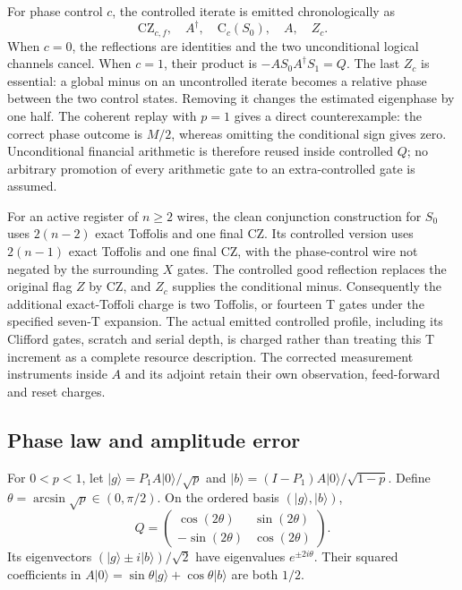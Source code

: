 For phase control $c$, the controlled iterate is emitted chronologically as
\[
 \mathrm{CZ}_{c,f},\quad A^\dagger,\quad
 \mathrm{C}_c(S_0),\quad A,\quad Z_c.
\]
When $c=0$, the reflections are identities and the two unconditional
logical channels cancel. When $c=1$, their product is
$-A S_0 A^\dagger S_1=Q$. The last $Z_c$ is essential: a global minus on an
uncontrolled iterate becomes a relative phase between the two control
states. Removing it changes the estimated eigenphase by one half. The
coherent replay with $p=1$ gives a direct counterexample: the correct phase
outcome is $M/2$, whereas omitting the conditional sign gives zero.
Unconditional financial arithmetic is therefore reused inside controlled
$Q$; no arbitrary promotion of every arithmetic gate to an extra-controlled
gate is assumed.

For an active register of $n\geq2$ wires, the clean conjunction construction
for $S_0$ uses $2(n-2)$ exact Toffolis and one final CZ. Its controlled
version uses $2(n-1)$ exact Toffolis and one final CZ, with the phase-control
wire not negated by the surrounding $X$ gates. The controlled good
reflection replaces the original flag $Z$ by CZ, and $Z_c$ supplies the
conditional minus. Consequently the additional exact-Toffoli charge is
two Toffolis, or fourteen T gates under the specified seven-T expansion.
The actual emitted controlled profile, including its Clifford gates,
scratch and serial depth, is charged rather than treating this T increment
as a complete resource description. The corrected measurement instruments
inside $A$ and its adjoint retain their own observation, feed-forward and
reset charges.

\subsection{Phase law and amplitude error}

For $0<p<1$, let $|g\rangle=P_1A|0\rangle/\sqrt p$ and
$|b\rangle=(I-P_1)A|0\rangle/\sqrt{1-p}$. Define
$\theta=\arcsin\sqrt p\in(0,\pi/2)$. On the ordered basis
$(|g\rangle,|b\rangle)$,
\[
 Q=\begin{pmatrix}\cos(2\theta)&\sin(2\theta)\\
                  -\sin(2\theta)&\cos(2\theta)\end{pmatrix}.
\]
Its eigenvectors $(|g\rangle\pm i|b\rangle)/\sqrt2$ have eigenvalues
$e^{\pm2i\theta}$. Their squared coefficients in
$A|0\rangle=\sin\theta|g\rangle+\cos\theta|b\rangle$ are both $1/2$.

